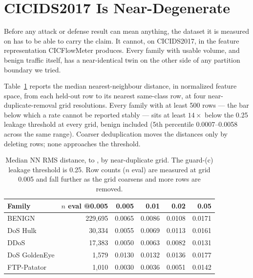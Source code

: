 \section{CICIDS2017 Is Near-Degenerate}
\label{sec:degeneracy}
Before any attack or defense result can mean anything, the dataset it is measured on has to be
able to carry the claim. It cannot, on CICIDS2017, in the feature representation
CICFlowMeter produces. Every family with usable volume, and benign traffic itself, has a
near-identical twin on the other side of any partition boundary we tried.

Table~\ref{tab:degeneracy} reports the median nearest-neighbour distance, in normalized
feature space, from each held-out  row to its nearest same-class
 row, at four near-duplicate-removal grid resolutions. Every family with
at least 500  rows — the bar below which a rate cannot be reported
stably — sits at least $14\times$ below the 0.25 leakage threshold at every grid, benign
included (5th percentile 0.0007–0.0058 across the same range). Coarser deduplication moves the
distances only by deleting rows; none approaches the threshold.

\begin{table}[t]
  \centering
  \caption{Median NN RMS distance, \texorpdfstring{}{trusted\_eval} to
  \texorpdfstring{}{honeypot\_pool}, by
  near-duplicate grid. The guard-(c) leakage threshold is 0.25. Row counts ($n$ eval) are
  measured at grid 0.005 and fall further as the grid coarsens and more rows are removed.}
  \label{tab:degeneracy}
  \small
  \begin{tabular}{lrrrrr}
    \toprule
    Family & $n$ eval @0.005 & 0.005 & 0.01 & 0.02 & 0.05 \\
    \midrule
    BENIGN         & 229{,}695 & 0.0065 & 0.0086 & 0.0108 & 0.0171 \\
    DoS Hulk       & 30{,}334  & 0.0055 & 0.0069 & 0.0113 & 0.0161 \\
    DDoS           & 17{,}383  & 0.0050 & 0.0063 & 0.0082 & 0.0131 \\
    DoS GoldenEye  & 1{,}579   & 0.0130 & 0.0132 & 0.0136 & 0.0177 \\
    FTP-Patator    & 1{,}010   & 0.0030 & 0.0036 & 0.0051 & 0.0142 \\
    \bottomrule
  \end{tabular}
\end{table}

